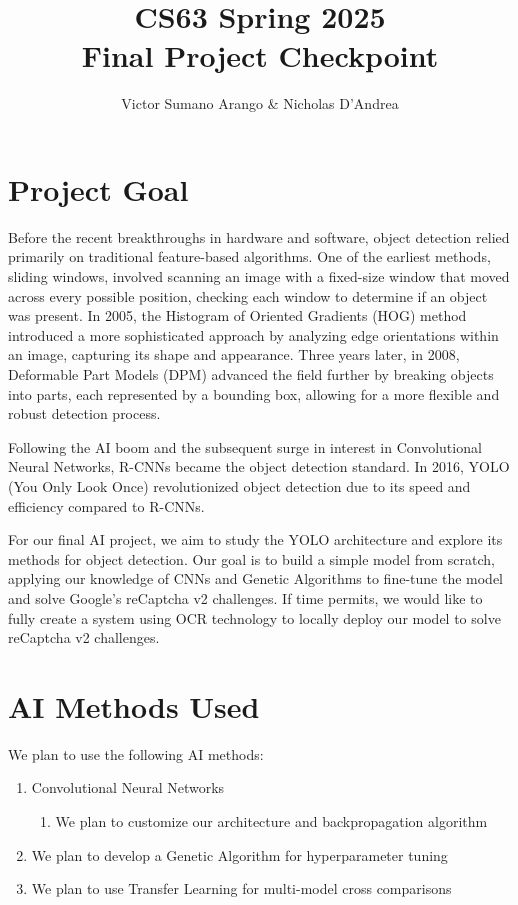 \documentclass[11pt]{article}
\title{CS63 Spring 2025\\Final Project Checkpoint}
\author{Victor Sumano Arango & Nicholas D'Andrea}
\date{}
\begin{document}
\maketitle

\section{Project Goal}

Before the recent breakthroughs in hardware and software, object detection relied primarily on traditional feature-based algorithms. 
One of the earliest methods, sliding windows, involved scanning an image with a fixed-size window that moved across every possible position, checking each window to determine if an object was present. 
In 2005, the Histogram of Oriented Gradients (HOG) method introduced a more sophisticated approach by analyzing edge orientations within an image, capturing its shape and appearance. 
Three years later, in 2008, Deformable Part Models (DPM) advanced the field further by breaking objects into parts, each represented by a bounding box, allowing for a more flexible and robust detection process.

Following the AI boom and the subsequent surge in interest in Convolutional Neural Networks, R-CNNs became the object detection standard. In 2016, YOLO (You Only Look Once) revolutionized object detection due to its speed and efficiency compared to R-CNNs.

For our final AI project, we aim to study the YOLO architecture and explore its methods for object detection. Our goal is to build a simple model from scratch, applying our knowledge of CNNs and Genetic Algorithms to fine-tune the model and solve Google's reCaptcha v2 challenges.
If time permits, we would like to fully create a system using OCR technology to locally deploy our model to solve reCaptcha v2 challenges.

\section{AI Methods Used}
We plan to use the following AI methods:
\begin{enumerate}
    \item Convolutional Neural Networks
    \begin{enumerate}
        \item We plan to customize our architecture and backpropagation algorithm
    \end{enumerate}
    \item We plan to develop a Genetic Algorithm for hyperparameter tuning
    \item We plan to use Transfer Learning for multi-model cross comparisons
\end{enumerate}
\end{document}
